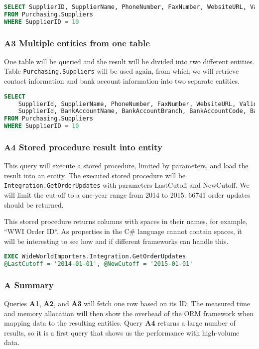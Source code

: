 \begin{lstlisting}[language=SQL]
SELECT SupplierID, SupplierName, PhoneNumber, FaxNumber, WebsiteURL, ValidFrom, ValidTo 
FROM Purchasing.Suppliers 
WHERE SupplierID = 10
\end{lstlisting}

\subsubsection*{A3 Multiple entities from one table}
One table will be queried and the result will be divided into two different entities. 
Table \texttt{Purchasing.Suppliers} will be used again, from which we will retrieve contact information and bank account information into two separate entities. 

\begin{lstlisting}[language=SQL]
SELECT 
    SupplierId, SupplierName, PhoneNumber, FaxNumber, WebsiteURL, ValidFrom, ValidTo, 
    SupplierId, BankAccountName, BankAccountBranch, BankAccountCode, BankAccountNumber, BankInternationalCode 
FROM Purchasing.Suppliers 
WHERE SupplierID = 10
\end{lstlisting}

\subsubsection*{A4 Stored procedure result into entity}
This query will execute a stored procedure, limited by parameters, and load the result into an entity.
The executed stored procedure will be \texttt{Integration.GetOrderUpdates} with parameters LastCutoff and NewCutoff. 
We will limit the cut-off to a one-year range from 2014 to 2015. 66741 order updates should be returned.

This stored procedure returns columns with spaces in their names, for example, ``WWI Order ID``. As properties in the C\# language cannot contain spaces, it will be interesting to see how and if different frameworks can handle this.

\begin{lstlisting}[language=SQL]
EXEC WideWorldImporters.Integration.GetOrderUpdates 
@LastCutoff = '2014-01-01', @NewCutoff = '2015-01-01'
\end{lstlisting}

\subsubsection*{A Summary}
Queries \textbf{A1}, \textbf{A2}, and \textbf{A3} will fetch one row based on its ID. The measured time and memory allocation will then show the overhead of the ORM framework when mapping data to the resulting entities. Query \textbf{A4} returns a large number of results, so it is a first query that shows us the performance with high-volume data.


